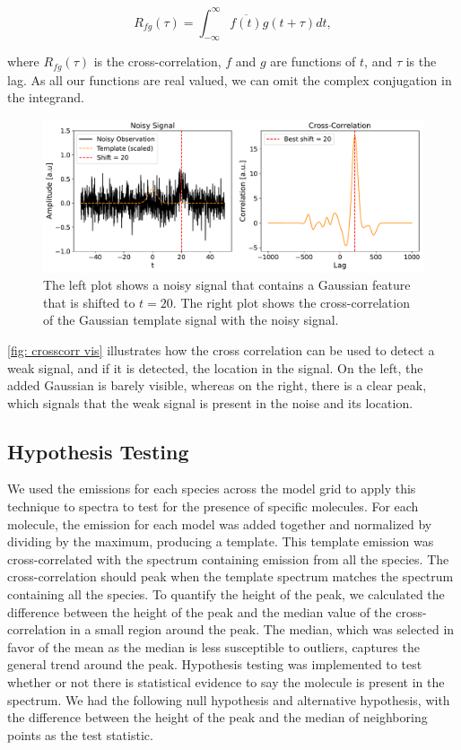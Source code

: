 \documentclass[oneside, single, authoryear, semicolon, 12pt]{lion-msc}
\newcommand{\4}{$_4$}
\newcommand{\3}{$_3$}
\newcommand{\2}{$_2$}
\begin{document}
\begin{equation}
    R_{fg}(\tau)=\int^\infty_{-\infty}\overline{f(t)}g(t+\tau)dt,
\end{equation}

where $R_{fg}(\tau)$ is the cross-correlation, $f$ and $g$ are functions of $t$, and $\tau$ is the lag. As all our functions are real valued, we can omit the complex conjugation in the integrand.

\begin{figure}[H]
    \centering
    \includegraphics[width=\linewidth]{Figures/Correlationexample.pdf}
    \caption{The left plot shows a noisy signal that contains a Gaussian feature that is shifted to $t=20$. The right plot shows the cross-correlation of the Gaussian template signal with the noisy signal.}
    \label{fig: crosscorr vis}
\end{figure}

\autoref{fig: crosscorr vis} illustrates how the cross correlation can be used to detect a weak signal, and if it is detected, the location in the signal. On the left, the added Gaussian is barely visible, whereas on the right, there is a clear peak, which signals that the weak signal is present in the noise and its location.

\newpage
\subsection{Hypothesis Testing}
We used the emissions for each species across the model grid to apply this technique to spectra to test for the presence of specific molecules. For each molecule, the emission for each model was added together and normalized by dividing by the maximum, producing a template. This template emission was cross-correlated with the spectrum containing emission from all the species. The cross-correlation should peak when the template spectrum matches the spectrum containing all the species. To quantify the height of the peak, we calculated the difference between the height of the peak and the median value of the cross-correlation in a small region around the peak. The median, which was selected in favor of the mean as the median is less susceptible to outliers, captures the general trend around the peak. Hypothesis testing was implemented to test whether or not there is statistical evidence to say the molecule is present in the spectrum. We had the following null hypothesis and alternative hypothesis, with the difference between the height of the peak and the median of neighboring points as the test statistic.
\end{document}
